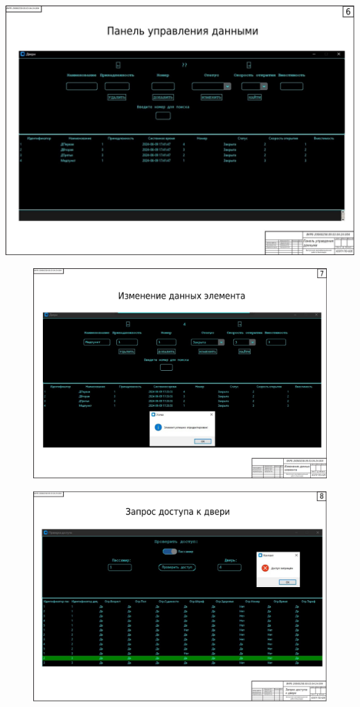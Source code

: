 \begin{landscape}
\begin{плакат}
	\includegraphics[width=0.82\linewidth]{images/плакат6}
	\label{fig:6}
\end{плакат}

\begin{figure}[H]
	\centering
	\includegraphics[width=0.82\linewidth]{images/плакат7.jpg}
	\label{fig:7}
\end{figure}

\begin{figure}[H]
	\centering
	\includegraphics[width=0.82\linewidth]{images/плакат8.jpg}
	\label{fig:8}
\end{figure}


\end{landscape}
